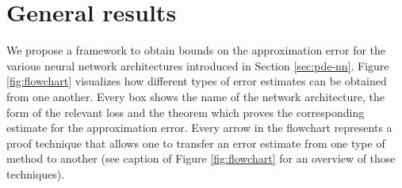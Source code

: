 \documentclass{article}
\numberwithin{equation}{section}
\newcommand{\1}{\mathbbm{1}}
\begin{document}

\section{General results}\label{sec:general}

We propose a framework to obtain bounds on the approximation error for the various neural network architectures introduced in Section \ref{sec:pde-nn}. Figure \ref{fig:flowchart} visualizes how different types of error estimates can be obtained from one another. Every box shows the name of the network architecture, the form of the relevant loss and the theorem which proves the corresponding estimate for the approximation error. Every arrow in the flowchart represents a proof technique that allows one to transfer an error estimate from one type of method to another (see caption of Figure \ref{fig:flowchart} for an overview of those techniques). 
\end{document}
